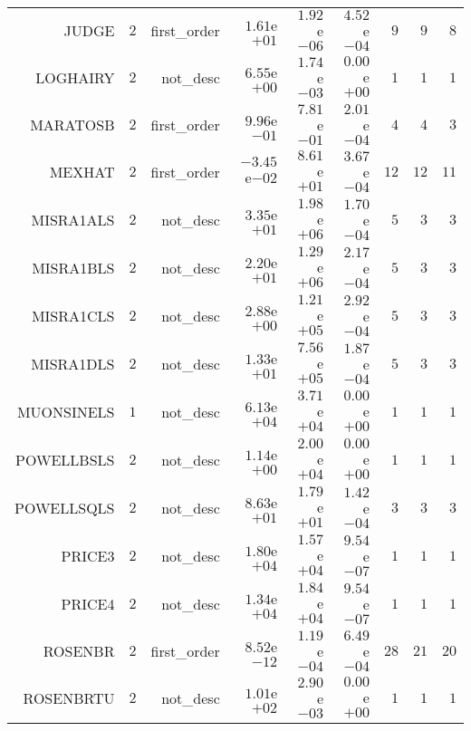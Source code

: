 \begin{longtable}{rrrrrrrrr}
JUDGE & \(     2\) & first\_order & \( 1.61\)e\(+01\) & \( 1.92\)e\(-06\) & \( 4.52\)e\(-04\) & \(     9\) & \(     9\) & \(     8\) \\
LOGHAIRY & \(     2\) & not\_desc & \( 6.55\)e\(+00\) & \( 1.74\)e\(-03\) & \( 0.00\)e\(+00\) & \(     1\) & \(     1\) & \(     1\) \\
MARATOSB & \(     2\) & first\_order & \( 9.96\)e\(-01\) & \( 7.81\)e\(-01\) & \( 2.01\)e\(-04\) & \(     4\) & \(     4\) & \(     3\) \\
MEXHAT & \(     2\) & first\_order & \(-3.45\)e\(-02\) & \( 8.61\)e\(+01\) & \( 3.67\)e\(-04\) & \(    12\) & \(    12\) & \(    11\) \\
MISRA1ALS & \(     2\) & not\_desc & \( 3.35\)e\(+01\) & \( 1.98\)e\(+06\) & \( 1.70\)e\(-04\) & \(     5\) & \(     3\) & \(     3\) \\
MISRA1BLS & \(     2\) & not\_desc & \( 2.20\)e\(+01\) & \( 1.29\)e\(+06\) & \( 2.17\)e\(-04\) & \(     5\) & \(     3\) & \(     3\) \\
MISRA1CLS & \(     2\) & not\_desc & \( 2.88\)e\(+00\) & \( 1.21\)e\(+05\) & \( 2.92\)e\(-04\) & \(     5\) & \(     3\) & \(     3\) \\
MISRA1DLS & \(     2\) & not\_desc & \( 1.33\)e\(+01\) & \( 7.56\)e\(+05\) & \( 1.87\)e\(-04\) & \(     5\) & \(     3\) & \(     3\) \\
MUONSINELS & \(     1\) & not\_desc & \( 6.13\)e\(+04\) & \( 3.71\)e\(+04\) & \( 0.00\)e\(+00\) & \(     1\) & \(     1\) & \(     1\) \\
POWELLBSLS & \(     2\) & not\_desc & \( 1.14\)e\(+00\) & \( 2.00\)e\(+04\) & \( 0.00\)e\(+00\) & \(     1\) & \(     1\) & \(     1\) \\
POWELLSQLS & \(     2\) & not\_desc & \( 8.63\)e\(+01\) & \( 1.79\)e\(+01\) & \( 1.42\)e\(-04\) & \(     3\) & \(     3\) & \(     3\) \\
PRICE3 & \(     2\) & not\_desc & \( 1.80\)e\(+04\) & \( 1.57\)e\(+04\) & \( 9.54\)e\(-07\) & \(     1\) & \(     1\) & \(     1\) \\
PRICE4 & \(     2\) & not\_desc & \( 1.34\)e\(+04\) & \( 1.84\)e\(+04\) & \( 9.54\)e\(-07\) & \(     1\) & \(     1\) & \(     1\) \\
ROSENBR & \(     2\) & first\_order & \( 8.52\)e\(-12\) & \( 1.19\)e\(-04\) & \( 6.49\)e\(-04\) & \(    28\) & \(    21\) & \(    20\) \\
ROSENBRTU & \(     2\) & not\_desc & \( 1.01\)e\(+02\) & \( 2.90\)e\(-03\) & \( 0.00\)e\(+00\) & \(     1\) & \(     1\) & \(     1\) \\

\end{longtable}

